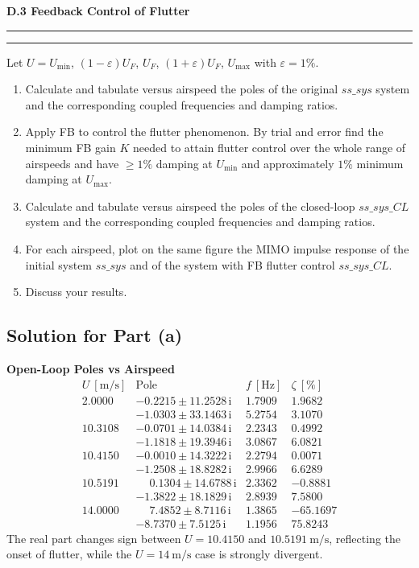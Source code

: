 \documentclass[12pt]{article}
\newcommand{\question}[1]{%
  \clearpage
  \vspace{0.5cm}
  {\noindent\normalsize \textbf{#1}}%
  \vspace{0.2cm}
  \hrule
  \vspace{0.1cm}
  \hrule
  \vspace{0.3cm}
}
\begin{document}
\question{D.3 Feedback Control of Flutter}\label{quest:D3}

Let $U = U_{\min}$, $(1-\varepsilon)U_F$, $U_F$, $(1+\varepsilon)U_F$, $U_{\max}$ with $\varepsilon = 1\%$.
\begin{enumerate}[label=(\alph*)]
  \item Calculate and tabulate versus airspeed the poles of the original $ss\_sys$ system and the corresponding coupled frequencies and damping ratios.
  \item Apply FB to control the flutter phenomenon. By trial and error find the minimum FB gain $K$ needed to attain flutter control over the whole range of airspeeds and have $\geq 1\%$ damping at $U_{\min}$ and approximately $1\%$ minimum damping at $U_{\max}$.
  \item Calculate and tabulate versus airspeed the poles of the closed-loop $ss\_sys\_CL$ system and the corresponding coupled frequencies and damping ratios.
  \item For each airspeed, plot on the same figure the MIMO impulse response of the initial system $ss\_sys$ and of the system with FB flutter control $ss\_sys\_CL$.
  \item Discuss your results.
\end{enumerate}
\subsection*{Solution for Part (a)}

\begin{resultsbox}
\textbf{Open-Loop Poles vs Airspeed}\\[0.5em]
\[
\begin{array}{c|c|c|c}
U~[\text{m/s}] & \text{Pole} & f~[\text{Hz}] & \zeta~[\%]\\
\hline
2.0000 & -0.2215 \pm 11.2528\,\mathrm{i} & 1.7909 & 1.9682\\
       & -1.0303 \pm 33.1463\,\mathrm{i} & 5.2754 & 3.1070\\[0.2em]
10.3108 & -0.0701 \pm 14.0384\,\mathrm{i} & 2.2343 & 0.4992\\
        & -1.1818 \pm 19.3946\,\mathrm{i} & 3.0867 & 6.0821\\[0.2em]
10.4150 & -0.0010 \pm 14.3222\,\mathrm{i} & 2.2794 & 0.0071\\
        & -1.2508 \pm 18.8282\,\mathrm{i} & 2.9966 & 6.6289\\[0.2em]
10.5191 & \phantom{-}0.1304 \pm 14.6788\,\mathrm{i} & 2.3362 & -0.8881\\
        & -1.3822 \pm 18.1829\,\mathrm{i} & 2.8939 & 7.5800\\[0.2em]
14.0000 & \phantom{-}7.4852 \pm 8.7116\,\mathrm{i} & 1.3865 & -65.1697\\
        & -8.7370 \pm 7.5125\,\mathrm{i} & 1.1956 & 75.8243
\end{array}
\]
The real part changes sign between $U = 10.4150$ and $10.5191~\text{m/s}$, reflecting the onset of flutter, while the $U=14~\text{m/s}$ case is strongly divergent.
\end{resultsbox}
\end{document}
